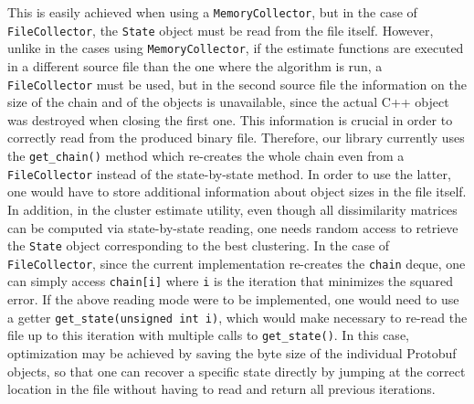 This is easily achieved when using a \verb|MemoryCollector|, but in the case of \verb|FileCollector|, the \verb|State| object must be read from the file itself.
However, unlike in the cases using \verb|MemoryCollector|, if the estimate functions are executed in a different source file than the one where the algorithm is run, a \verb|FileCollector| must be used, but in the second source file the information on the size of the chain and of the objects is unavailable, since the actual C++ object was destroyed when closing the first one.
This information is crucial in order to correctly read from the produced binary file.
Therefore, our library currently uses the \verb|get_chain()| method which re-creates the whole chain even from a \verb|FileCollector| instead of the state-by-state method.
In order to use the latter, one would have to store additional information about object sizes in the file itself. \\
In addition, in the cluster estimate utility, even though all dissimilarity matrices can be computed via state-by-state reading, one needs random access to retrieve the \verb|State| object corresponding to the best clustering.
In the case of \verb|FileCollector|, since the current implementation re-creates the \verb|chain| deque, one can simply access \verb|chain[i]| where \verb|i| is the iteration that minimizes the squared error.
If the above reading mode were to be implemented, one would need to use a getter \verb|get_state(unsigned int i)|, which would make necessary to re-read the file up to this iteration with multiple calls to \verb|get_state()|.
In this case, optimization may be achieved by saving the byte size of the individual Protobuf objects, so that one can recover a specific state directly by jumping at the correct location in the file without having to read and return all previous iterations.
